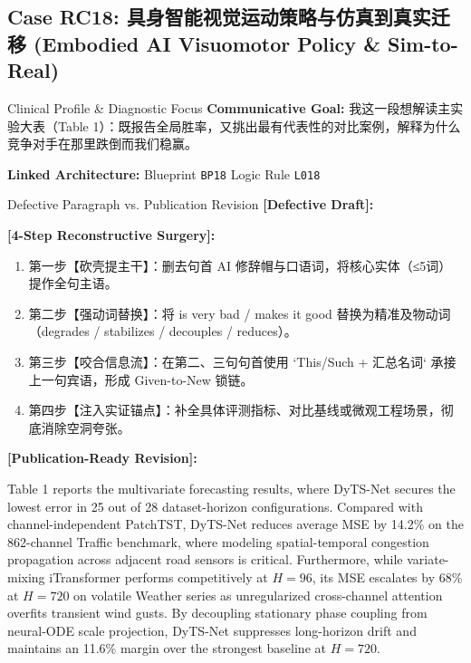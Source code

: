 \subsection{Case RC18: 具身智能视觉运动策略与仿真到真实迁移 (Embodied AI Visuomotor Policy \& Sim-to-Real)}\label{case:RC18}
\begin{ConceptBox}{Clinical Profile \& Diagnostic Focus}
\textbf{Communicative Goal:} 我这一段想解读主实验大表（Table 1）：既报告全局胜率，又挑出最有代表性的对比案例，解释为什么竞争对手在那里跌倒而我们稳赢。\par
\textbf{Linked Architecture:} Blueprint \texttt{BP18} \enspace\textbar\enspace Logic Rule \texttt{L018}
\end{ConceptBox}
\begin{ExampleBox}{Defective Paragraph vs. Publication Revision}
\textbf{\color{TargetHighlight}[Defective Draft]:}\par
{}\par\vspace{6pt}
\textbf{\color{AcadForest}[4-Step Reconstructive Surgery]:}
\begin{enumerate}[label=\textbf{\color{AcadNavy}Step \arabic*:}, leftmargin=2em]
  \item 第一步【砍壳提主干】：删去句首 AI 修辞帽与口语词，将核心实体（≤5词）提作全句主语。
  \item 第二步【强动词替换】：将 is very bad / makes it good 替换为精准及物动词（degrades / stabilizes / decouples / reduces）。
  \item 第三步【咬合信息流】：在第二、三句句首使用 `This/Such + 汇总名词` 承接上一句宾语，形成 Given-to-New 锁链。
  \item 第四步【注入实证锚点】：补全具体评测指标、对比基线或微观工程场景，彻底消除空洞夸张。
\end{enumerate}\vspace{4pt}
\textbf{\color{AcadNavy}[Publication-Ready Revision]:}\par
Table 1 reports the multivariate forecasting results, where DyTS-Net secures the lowest error in 25 out of 28 dataset-horizon configurations. Compared with channel-independent PatchTST, DyTS-Net reduces average MSE by 14.2\% on the 862-channel Traffic benchmark, where modeling spatial-temporal congestion propagation across adjacent road sensors is critical. Furthermore, while variate-mixing iTransformer performs competitively at $H=96$, its MSE escalates by 68\% at $H=720$ on volatile Weather series as unregularized cross-channel attention overfits transient wind gusts. By decoupling stationary phase coupling from neural-ODE scale projection, DyTS-Net suppresses long-horizon drift and maintains an 11.6\% margin over the strongest baseline at $H=720$.
\end{ExampleBox}
